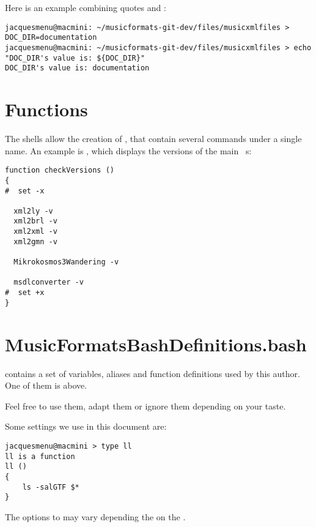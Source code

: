 Here is an example combining quotes and \doubleQuotes:
\begin{lstlisting}[language=Terminal]
jacquesmenu@macmini: ~/musicformats-git-dev/files/musicxmlfiles > DOC_DIR=documentation
jacquesmenu@macmini: ~/musicformats-git-dev/files/musicxmlfiles > echo "DOC_DIR's value is: ${DOC_DIR}"
DOC_DIR's value is: documentation
\end{lstlisting}


\section{Functions}

The shells allow the creation of , that contain several commands under a single name. An example is , which displays the versions of the main \mf\ \service s:
\begin{lstlisting}[language=Terminal]
function checkVersions ()
{
#  set -x

  xml2ly -v
  xml2brl -v
  xml2xml -v
  xml2gmn -v

  Mikrokosmos3Wandering -v

  msdlconverter -v
#  set +x
}
\end{lstlisting}


\section{MusicFormatsBashDefinitions.bash}

 contains a set of variables, aliases and function definitions used by this author. One of them is  above.

Feel free to use them, adapt them or ignore them depending on your taste.

Some settings we use in this document are:
\begin{lstlisting}[language=Terminal]
jacquesmenu@macmini > type ll
ll is a function
ll () 
{ 
    ls -salGTF $*
}
\end{lstlisting}
The options to  may vary depending the on the \OS.

